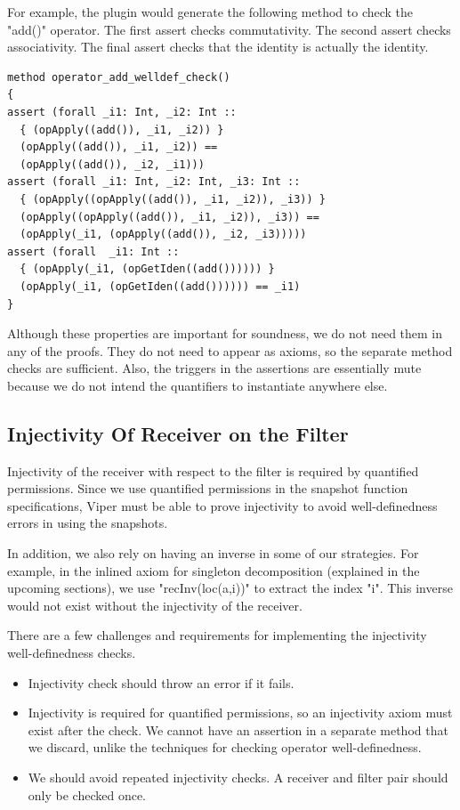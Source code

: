 \documentclass[msc,oneside]{ubcthesis}
\theoremstyle{definition}
\begin{document}
For example, the plugin would generate the following method to check the "add()" operator. The first assert checks commutativity. The second assert checks associativity. The final assert checks that the identity is actually the identity. 
\begin{lstlisting}
method operator_add_welldef_check()
{
assert (forall _i1: Int, _i2: Int ::
  { (opApply((add()), _i1, _i2)) }
  (opApply((add()), _i1, _i2)) ==
  (opApply((add()), _i2, _i1)))
assert (forall _i1: Int, _i2: Int, _i3: Int ::
  { (opApply((opApply((add()), _i1, _i2)), _i3)) }
  (opApply((opApply((add()), _i1, _i2)), _i3)) ==
  (opApply(_i1, (opApply((add()), _i2, _i3)))))
assert (forall  _i1: Int ::
  { (opApply(_i1, (opGetIden((add()))))) }
  (opApply(_i1, (opGetIden((add()))))) == _i1)
}
\end{lstlisting}
Although these properties are important for soundness, we do not need them in any of the proofs. They do not need to appear as axioms, so the separate method checks are sufficient. Also, the triggers in the assertions are essentially mute because we do not intend the quantifiers to instantiate anywhere else. 

\subsection{Injectivity Of Receiver on the Filter}
Injectivity of the receiver with respect to the filter is required by quantified permissions. Since we use quantified permissions in the snapshot function specifications, Viper must be able to prove injectivity to avoid well-definedness errors in using the snapshots. 

In addition, we also rely on having an inverse in some of our strategies. For example, in the inlined axiom for singleton decomposition (explained in the upcoming sections), we use "recInv(loc(a,i))" to extract the index "i". This inverse would not exist without the injectivity of the receiver.

There are a few challenges and requirements for implementing the injectivity well-definedness checks.
\begin{itemize}
    \item Injectivity check should throw an error if it fails.
    \item Injectivity is required for quantified permissions, so an injectivity axiom must exist after the check. We cannot have an assertion in a separate method that we discard, unlike the techniques for checking operator well-definedness.
    \item We should avoid repeated injectivity checks. A receiver and filter pair should only be checked once.
\end{itemize}
\end{document}
